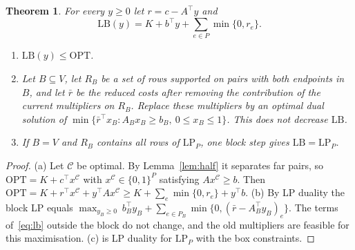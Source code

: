 \documentclass[11pt]{article}
\newtheorem{theorem}{Theorem}
\theoremstyle{definition}
\newcommand{\OPT}{\mathrm{OPT}}
\newcommand{\LB}{\mathrm{LB}}
\begin{document}
\begin{theorem}\label{thm:anytime}
For every $y\ge 0$ let $r=c-A^\top y$ and
\begin{equation}\label{eq:lb}
\LB(y)=K+b^\top y+\sum_{e\in P}\min\{0,r_e\}.
\end{equation}
\begin{enumerate}
\item[(a)] $\LB(y)\le\OPT$.
\item[(b)] Let $B\subseteq V$, let $R_B$ be a set of rows supported on pairs
with both endpoints in $B$, and let $\bar r$ be the reduced costs after
removing the contribution of the current multipliers on $R_B$.  Replace these
multipliers by an optimal dual solution of
$\min\{\bar r^\top x_B: A_Bx_B\ge b_B,\ 0\le x_B\le 1\}$.  This does not
decrease $\LB$.
\item[(c)] If $B=V$ and $R_B$ contains all rows of $\mathrm{LP}_P$, one block
step gives $\LB=\mathrm{LP}_P$.
\end{enumerate}
\end{theorem}
\begin{proof}
(a) Let $\mathcal C$ be optimal.  By Lemma~\ref{lem:half} it separates far
pairs, so $\OPT=K+c^\top x^{\mathcal C}$ with $x^{\mathcal C}\in\{0,1\}^P$
satisfying $Ax^{\mathcal C}\ge b$.  Then
$\OPT=K+r^\top x^{\mathcal C}+y^\top Ax^{\mathcal C}\ge K+\sum_e\min\{0,r_e\}+y^\top b$.
(b) By LP duality the block LP equals
$\max_{y_B\ge0}\ b_B^\top y_B+\sum_{e\in P_B}\min\{0,(\bar r-A_B^\top
y_B)_e\}$.  The terms of~\eqref{eq:lb} outside the block do not change, and
the old multipliers are feasible for this maximisation.  (c) is LP duality
for $\mathrm{LP}_P$ with the box constraints.
\end{proof}
\end{document}
